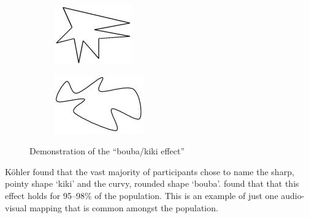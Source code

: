 \begin{figure}[ht]
\centering
\begin{subfigure}{.5\textwidth}
  \centering
  \includegraphics[width=0.7\linewidth]{figs/kiki.png}
  \label{fig:kiki}
\end{subfigure}%
\begin{subfigure}{.5\textwidth}
  \centering
  \includegraphics[width=0.7\linewidth]{figs/bouba.png}
  \label{fig:bouba}
\end{subfigure}
  \caption{Demonstration of the ``bouba/kiki effect'' \citep{Ramachandran2001}}
  \label{fig:boubakiki}
\end{figure}

K\"{o}hler found that the vast majority of participants chose to name the sharp, pointy shape `kiki' and the curvy,
rounded shape `bouba'. \citet{Ramachandran2001} found that that this effect holds for 95--98\% of the population. This
is an example of just one audio-visual mapping that is common amongst the population.



